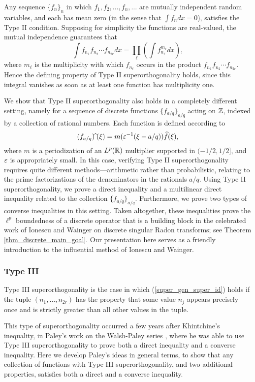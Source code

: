 \documentclass[oneside,11pt]{amsart}
\begin{document}
Any sequence $\{ f_n\}_n$ in which $f_1,f_2,\ldots,f_n,\ldots$  are mutually independent  random variables, and each has mean zero (in the sense that $\int f_n dx =0$), satisfies the Type II condition. 
Supposing for simplicity the functions are real-valued, the mutual independence guarantees that 
\[ \int f_{n_1} f_{n_2} \cdots f_{n_{2r}} dx  = \prod_\ell ( \int f_{n_\ell}^{m_\ell} dx),\]
where $m_\ell$ is the multiplicity with which $f_{n_\ell}$ occurs in the product $f_{n_1}f_{n_2}\cdots f_{n_{2r}}$. Hence the defining property of Type II superorthogonality holds, since this integral vanishes as soon as at least one function has multiplicity one.  


  We  show  that Type II  superorthogonality   also holds in a completely different setting, namely for a sequence of discrete functions $\{ f_{a/q}\}_{a/q}$ acting on $\mathbb{Z}$, indexed by a  collection of rational numbers. Each function is defined according to 
\[ (f_{a/q})\widehat{\;}(\xi)  = m(\varepsilon^{-1}(\xi - a/q)) \widehat{f}(\xi),
\]
where  $m$ is a  periodization of an $L^p(\mathbb{R})$ multiplier supported in $(-1/2,1/2]$, and   $\varepsilon$ is appropriately small. In this case, verifying Type II superorthogonality requires quite different methods---arithmetic rather than probabilistic, relating to the prime factorizations of the denominators in the rationals $a/q$. 
Using Type II superorthogonality, we  prove  a direct inequality and a multilinear direct inequality related to the collection $\{f_{a/q}\}_{a/q}$.
Furthermore, we prove two types of   converse inequalities in this setting. Taken altogether, these inequalities prove  the $\ell^p$ boundedness  of a discrete operator that is a building block in the celebrated work of Ionescu and Wainger \cite{IW} on discrete singular Radon transforms; see Theorem \ref{thm_discrete_main_goal}.   Our  presentation here serves as a friendly introduction to  the influential method of Ionescu and Wainger.\\

\subsubsection*{Type III} Type III superorthogonality is the case in which  (\ref{super_gen_super_id}) holds if the tuple $(n_1, \ldots, n_{2r})$ has the property that some value $n_j$ appears precisely once and is strictly greater than all other values in the tuple.  

This type of superorthogonality  occurred a few years after Khintchine's inequality, in Paley's work on the Walsh-Paley series \cite{Pal32}, where he was able to use Type III superorthogonality  to prove both a direct inequality and  a converse inequality. Here we develop Paley's  ideas in general terms, to show that any collection of functions with Type III superorthogonality, and two additional properties, satisfies both a direct and a converse inequality.\\
\end{document}
